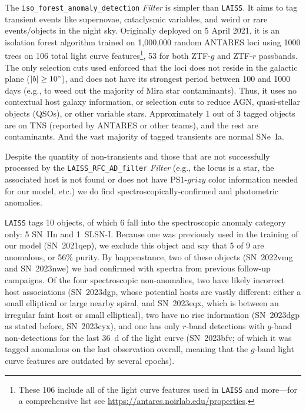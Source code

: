 \documentclass[twocolumn]{aastex63}
\newcommand{\laiss}{\texttt{LAISS}}
\begin{document}
The \texttt{iso\_forest\_anomaly\_detection} \emph{Filter} is simpler than \laiss{}. It aims to tag transient events like supernovae, cataclysmic variables, and weird or rare events/objects in the night sky. Originally deployed on 5 April 2021, it is an isolation forest algorithm \citep{Liu2012} trained on 1,000,000 random ANTARES loci using 1000 trees on 106 total light curve features\footnote{These 106 include all of the light curve features used in \laiss{} and more---for a comprehensive list see \url{https://antares.noirlab.edu/properties}.}, 53 for both ZTF-$g$ and ZTF-$r$ passbands. The only selection cuts used enforced that the loci does not reside in the galactic plane ($|b| \geq 10\degree$), and does not have its strongest period between 100 and 1000 days (e.g., to weed out the majority of Mira star contaminants). Thus, it uses no contextual host galaxy information, or selection cuts to reduce AGN, quasi-stellar objects (QSOs), or other variable stars. Approximately 1 out of 3 tagged objects are on TNS (reported by ANTARES or other teams), and the rest are contaminants. And the vast majority of tagged transients are normal SNe~Ia. \par

Despite the quantity of non-transients and those that are not successfully processed by the \texttt{LAISS\_RFC\_AD\_filter} \emph{Filter} (e.g., the locus is a star, the associated host is not found or does not have PS1-$grizy$ color information needed for our model, etc.) we do find spectroscopically-confirmed and photometric anomalies. \par

\texttt{LAISS} tags 10 objects, of which 6 fall into the spectroscopic anomaly category only: 5 SN~IIn and 1~SLSN-I. Because one was previously used in the training of our model (SN~2021qep), we exclude this object and say that 5 of 9 are anomalous, or 56\% purity. By happenstance, two of these objects (SN~2022vmg and SN~2023nwe) we had confirmed with spectra from previous follow-up campaigns. Of the four spectroscopic non-anomalies, two have likely incorrect host associations (SN~2023dgp, whose potential hosts are vastly different: either a small elliptical or large nearby spiral, and SN~2023eqx, which is between an irregular faint host or small elliptical), two have no rise information (SN~2023dgp as stated before, SN~2023cyx), and one has only $r$-band detections with $g$-band non-detections for the last 36~d of the light curve (SN~2023bfv; of which it was tagged anomalous on the last observation overall, meaning that the $g$-band light curve features are outdated by several epochs). \par
\end{document}

